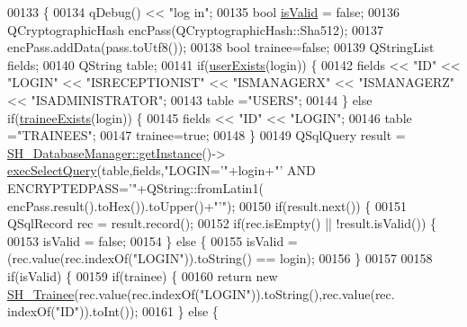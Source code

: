 \begin{DoxyCode}
00133 \{
00134     qDebug() << \textcolor{stringliteral}{"log in"};
00135     \textcolor{keywordtype}{bool} \hyperlink{classSH__User_aa1b7fd66632c13905f3b6fd941505c02}{isValid} = \textcolor{keyword}{false};
00136     QCryptographicHash encPass(QCryptographicHash::Sha512);
00137     encPass.addData(pass.toUtf8());
00138     \textcolor{keywordtype}{bool} trainee=\textcolor{keyword}{false};
00139     QStringList fields;
00140     QString table;
00141     \textcolor{keywordflow}{if}(\hyperlink{classSH__User_a5ca23c3c396d8867d5d605d087efb82f}{userExists}(login)) \{
00142         fields << \textcolor{stringliteral}{"ID"} << \textcolor{stringliteral}{"LOGIN"} << \textcolor{stringliteral}{"ISRECEPTIONIST"} << \textcolor{stringliteral}{"ISMANAGERX"} << \textcolor{stringliteral}{"ISMANAGERZ"} << \textcolor{stringliteral}{"ISADMINISTRATOR"};
00143         table =\textcolor{stringliteral}{"USERS"};
00144     \} \textcolor{keywordflow}{else} \textcolor{keywordflow}{if}(\hyperlink{classSH__User_af40edc91cf1a4d8065fb43d2899c3dcb}{traineeExists}(login)) \{
00145         fields << \textcolor{stringliteral}{"ID"} << \textcolor{stringliteral}{"LOGIN"};
00146         table =\textcolor{stringliteral}{"TRAINEES"};
00147         trainee=\textcolor{keyword}{true};
00148     \}
00149     QSqlQuery result = \hyperlink{classSH__DatabaseManager_a638369a15265ab0aa053080a32d2ca39}{SH\_DatabaseManager::getInstance}()->
      \hyperlink{classSH__DatabaseManager_ab8f9850cb68444ab9a4e613b36a3b044}{execSelectQuery}(table,fields,\textcolor{stringliteral}{"LOGIN='"}+login+\textcolor{stringliteral}{"' AND ENCRYPTEDPASS='"}+QString::fromLatin1(
      encPass.result().toHex()).toUpper()+\textcolor{stringliteral}{"'"});
00150     \textcolor{keywordflow}{if}(result.next()) \{
00151         QSqlRecord rec = result.record();
00152         \textcolor{keywordflow}{if}(rec.isEmpty() || !result.isValid()) \{
00153             isValid = \textcolor{keyword}{false};
00154         \} \textcolor{keywordflow}{else} \{
00155             isValid = (rec.value(rec.indexOf(\textcolor{stringliteral}{"LOGIN"})).toString() == login);
00156         \}
00157 
00158         \textcolor{keywordflow}{if}(isValid) \{
00159             \textcolor{keywordflow}{if}(trainee) \{
00160                 \textcolor{keywordflow}{return} \textcolor{keyword}{new} \hyperlink{classSH__Trainee}{SH\_Trainee}(rec.value(rec.indexOf(\textcolor{stringliteral}{"LOGIN"})).toString(),rec.value(rec.
      indexOf(\textcolor{stringliteral}{"ID"})).toInt());
00161             \} \textcolor{keywordflow}{else} \{

\end{DoxyCode}
